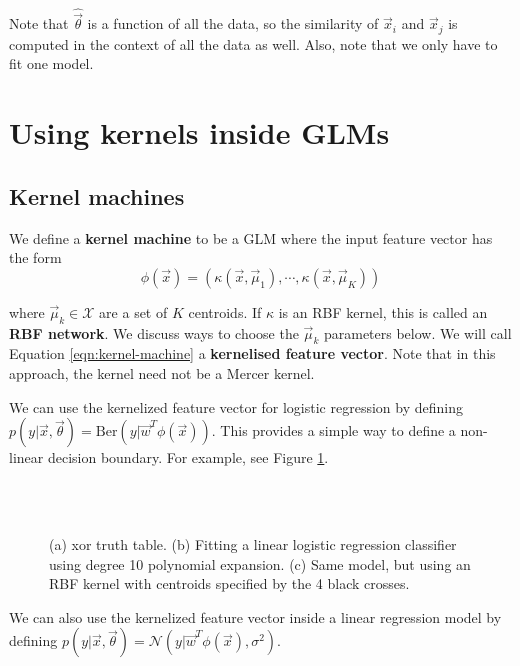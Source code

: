 Note that $\hat{\vec{\theta}}$ is a function of all the data, so the similarity of $\vec{x}_i$ and $\vec{x}_j$ is computed in the context of all the data as well. Also, note that we only have to fit one model.


\section{Using kernels inside GLMs}


\subsection{Kernel machines}
We define a \textbf{kernel machine} to be a GLM where the input feature vector has the form
\begin{equation}\label{eqn:kernel-machine}
\phi(\vec{x})=(\kappa(\vec{x},\vec{\mu}_1),\cdots,\kappa(\vec{x},\vec{\mu}_K))
\end{equation}

where $\vec{\mu}_k \in \mathcal{X}$ are a set of $K$ centroids. If $\kappa$ is an RBF kernel, this is called an \textbf{RBF network}. We discuss ways to choose the $\vec{\mu}_k$ parameters below. We will call Equation \ref{eqn:kernel-machine} a \textbf{kernelised feature vector}. Note that in this approach, the kernel need not be a Mercer kernel.

We can use the kernelized feature vector for logistic regression by defining $p(y|\vec{x},\vec{\theta})=\mathrm{Ber}(y|\vec{w}^T\phi(\vec{x}))$. This provides a simple way to define a non-linear decision boundary. For example, see Figure \ref{fig:kenel-machine-xor}.

\begin{figure}[hbtp]
\centering
{} \\
 \\
\caption{(a) xor truth table. (b) Fitting a linear logistic regression classifier using degree 10 polynomial expansion. (c) Same model, but using an RBF kernel with centroids specified by the 4 black crosses.}
\label{fig:kenel-machine-xor} 
\end{figure}

We can also use the kernelized feature vector inside a linear regression model by defining $p(y|\vec{x},\vec{\theta})=\mathcal{N}(y|\vec{w}^T\phi(\vec{x}),\sigma^2)$. 


